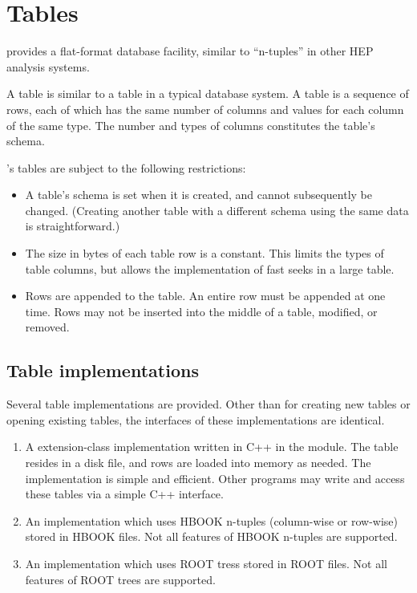 \chapter{Tables}

\pyhep provides a flat-format database facility, similar to ``n-tuples''
in other HEP analysis systems.  

A \pyhep table is similar to a table in a typical database system.  A
table is a sequence of rows, each of which has the same number of
columns and values for each column of the same type.  The number and
types of columns constitutes the table's schema.  

\pyhep's tables are subject to the following restrictions:

\begin{itemize}

 \item A table's schema is set when it is created, and cannot
 subsequently be changed.  (Creating another table with a different
 schema using the same data is straightforward.)

 \item The size in bytes of each table row is a constant.  This limits
 the types of table columns, but allows the implementation of fast seeks
 in a large table.

 \item Rows are appended to the table.  An entire row must be appended
 at one time.  Rows may not be inserted into the middle of a table,
 modified, or removed.

\end{itemize}

\section{Table implementations}

Several table implementations are provided.  Other than for creating new
tables or opening existing tables, the interfaces of these
implementations are identical.

\begin{enumerate}

 \item A extension-class implementation written in C++ in the
  module.  The table resides in a disk file, and rows
 are loaded into memory as needed.  The implementation is simple and
 efficient.  Other programs may write and access these tables via a
 simple C++ interface.

 \item An implementation which uses HBOOK n-tuples (column-wise or
 row-wise) stored in HBOOK files.  Not all features of HBOOK n-tuples are
 supported.

 \item An implementation which uses ROOT tress stored in ROOT files.
 Not all features of ROOT trees are supported.

\end{enumerate}

